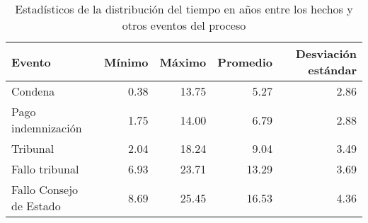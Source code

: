 \begin{table}[h]
\centering
\caption{Estadísticos de la distribución del
tiempo en años entre los hechos y otros eventos del proceso} 
\label{tab:hechos-evento}
\begin{tabular}{lrrrr}
  \hline
Evento & Mínimo & Máximo & Promedio & Desviación estándar \\ 
  \hline
Condena & 0.38 & 13.75 & 5.27 & 2.86 \\ 
  Pago indemnización & 1.75 & 14.00 & 6.79 & 2.88 \\ 
  Tribunal & 2.04 & 18.24 & 9.04 & 3.49 \\ 
  Fallo tribunal & 6.93 & 23.71 & 13.29 & 3.69 \\ 
  Fallo Consejo de Estado & 8.69 & 25.45 & 16.53 & 4.36 \\ 
   \hline
\end{tabular}
\end{table}
